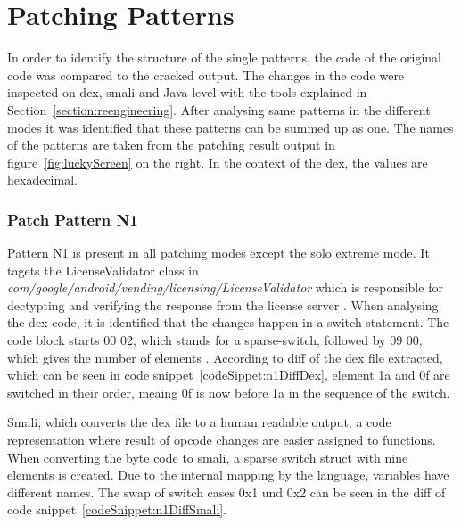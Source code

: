\section{Patching Patterns} \label{section:luckypatcher-patterns}
In order to identify the structure of the single patterns, the code of the original code was compared to the cracked output.
The changes in the code were inspected on dex, smali and Java level with the tools explained in Section~\ref{section:reengineering}.
After analysing same patterns in the different modes it was identified that these patterns can be summed up as one.
\newline
The names of the patterns are taken from the patching result output in figure~\ref{fig:luckyScreen} on the right.
In the context of the \gls{dex}, the values are hexadecimal.
\subsubsection{Patch Pattern N1}
Pattern N1 is present in all patching modes except the solo extreme mode.
It tagets the LicenseValidator class in \textit{com/google/android/vending/licensing/LicenseValidator} which is responsible for dectypting and verifying the response from the license server \cite{developersLicensingReference}.
\newline
When analysing the dex code, it is identified that the changes happen in a switch statement.
The code block starts 00 02, which stands for a sparse-switch, followed by 09 00, which gives the number of elements \cite{opcodes}.
According to diff of the \gls{dex} file extracted, which can be seen in code snippet~\ref{codeSippet:n1DiffDex}, element 1a and 0f are switched in their order, meaing 0f is now before 1a in the sequence of the switch.
\newline


Smali, which converts the \gls{dex} file to a human readable output, a code representation where result of opcode changes are easier assigned to functions.
When converting the byte code to smali, a sparse switch struct with nine elements is created.
Due to the internal mapping by the language, variables have different names.
The swap of switch cases 0x1 und 0x2 can be seen in the diff of code snippet~\ref{codeSnippet:n1DiffSmali}.
\newline


